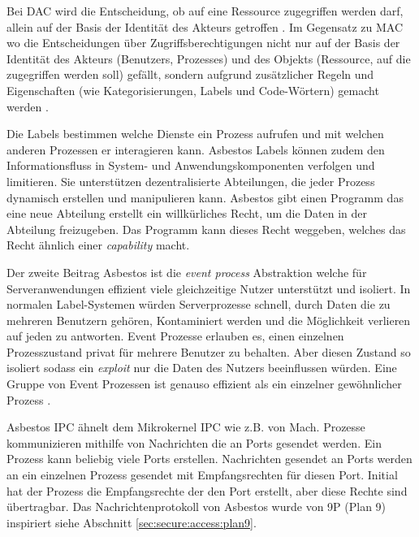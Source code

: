 \documentclass[11pt,technote]{IEEEtran}
\begin{document}
      Bei DAC wird die Entscheidung, ob auf eine Ressource zugegriffen werden darf, allein auf der Basis der Identität des Akteurs getroffen \cite{Url:dac}.      
      Im Gegensatz zu MAC wo die Entscheidungen über Zugriffsberechtigungen nicht nur auf der Basis der Identität des Akteurs 
      (Benutzers, Prozesses) und des Objekts (Ressource, auf die zugegriffen     
      werden soll) gefällt, sondern aufgrund zusätzlicher Regeln und Eigenschaften (wie Kategorisierungen, Labels und Code-Wörtern) gemacht werden \cite{Url:mac}.
      
      Die Labels bestimmen welche Dienste ein Prozess aufrufen und mit welchen anderen Prozessen er interagieren kann. 
      Asbestos Labels k\"onnen zudem den Informationsfluss in System- und Anwendungskomponenten verfolgen und limitieren.
      Sie unterst\"utzen dezentralisierte Abteilungen, die jeder Prozess dynamisch erstellen und manipulieren kann.
      Asbestos gibt einen Programm das eine neue Abteilung erstellt ein willk\"urliches Recht, um die Daten in der Abteilung freizugeben.
      Das Programm kann dieses Recht weggeben, welches das Recht \"ahnlich einer \textit{capability} macht.
      
      Der zweite Beitrag Asbestos ist die \textit{event process} Abstraktion welche f\"ur Serveranwendungen 
      effizient viele gleichzeitige Nutzer unterst\"utzt und isoliert.
      In normalen Label-Systemen w\"urden Serverprozesse schnell, durch Daten die zu mehreren Benutzern geh\"oren, Kontaminiert werden und die 
      M\"oglichkeit verlieren auf jeden zu antworten. Event Prozesse erlauben es, einen einzelnen Prozesszustand privat f\"ur mehrere Benutzer zu behalten.
      Aber diesen Zustand so isoliert sodass ein \textit{exploit} nur die Daten des Nutzers beeinflussen w\"urden.
      Eine Gruppe von Event Prozessen ist genauso effizient als ein einzelner gew\"ohnlicher Prozess \cite[S. 1]{inproc:asbestos}.
      
      Asbestos IPC \"ahnelt dem Mikrokernel IPC wie z.B. von Mach. Prozesse kommunizieren mithilfe von Nachrichten die an Ports gesendet werden. Ein Prozess kann
      beliebig viele Ports erstellen. Nachrichten gesendet an Ports werden an ein einzelnen Prozess gesendet mit Empfangsrechten f\"ur diesen Port. 
      Initial hat der Prozess
      die Empfangsrechte der den Port erstellt, aber diese Rechte sind \"ubertragbar. Das Nachrichtenprotokoll von Asbestos wurde von 9P (Plan 9) inspiriert
      siehe Abschnitt \ref{sec:secure:access:plan9}.      
      
\end{document}
